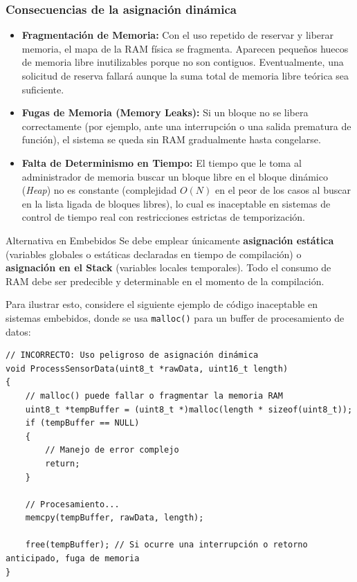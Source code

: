 \documentclass[
10pt, %
a4paper, %
oneside, %
headinclude,footinclude, %
BCOR5mm, %
]{scrartcl}
\begin{document}
\subsubsection{Consecuencias de la asignación dinámica}
\begin{itemize}
	\item \textbf{Fragmentación de Memoria:} Con el uso repetido de reservar y liberar memoria, el mapa de la RAM física se fragmenta. Aparecen pequeños huecos de memoria libre inutilizables porque no son contiguos. Eventualmente, una solicitud de reserva fallará aunque la suma total de memoria libre teórica sea suficiente.
	\item \textbf{Fugas de Memoria (Memory Leaks):} Si un bloque no se libera correctamente (por ejemplo, ante una interrupción o una salida prematura de función), el sistema se queda sin RAM gradualmente hasta congelarse.
	\item \textbf{Falta de Determinismo en Tiempo:} El tiempo que le toma al administrador de memoria buscar un bloque libre en el bloque dinámico (\textit{Heap}) no es constante (complejidad $O(N)$ en el peor de los casos al buscar en la lista ligada de bloques libres), lo cual es inaceptable en sistemas de control de tiempo real con restricciones estrictas de temporización.
\end{itemize}

\begin{WarningBox}{Alternativa en Embebidos}
	Se debe emplear únicamente \textbf{asignación estática} (variables globales o estáticas declaradas en tiempo de compilación) o \textbf{asignación en el Stack} (variables locales temporales). Todo el consumo de RAM debe ser predecible y determinable en el momento de la compilación.
\end{WarningBox}

Para ilustrar esto, considere el siguiente ejemplo de código inaceptable en sistemas embebidos, donde se usa \texttt{malloc()} para un buffer de procesamiento de datos:

\begin{lstlisting}[style=CMakeStyle]
// INCORRECTO: Uso peligroso de asignación dinámica
void ProcessSensorData(uint8_t *rawData, uint16_t length)
{
    // malloc() puede fallar o fragmentar la memoria RAM
    uint8_t *tempBuffer = (uint8_t *)malloc(length * sizeof(uint8_t));
    if (tempBuffer == NULL)
    {
        // Manejo de error complejo
        return;
    }
    
    // Procesamiento...
    memcpy(tempBuffer, rawData, length);
    
    free(tempBuffer); // Si ocurre una interrupción o retorno anticipado, fuga de memoria
}
\end{lstlisting}
\end{document}
